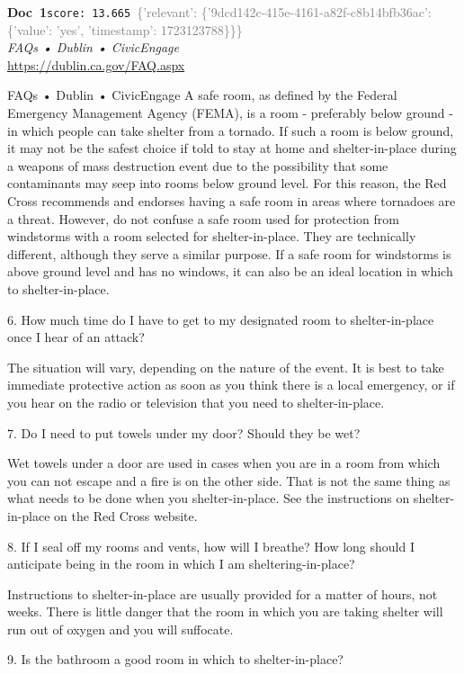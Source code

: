 \documentclass[a4paper,11pt]{article}
\begin{document}
\begin{docenv}
{\footnotesize\textcolor{doccolor}{\textbf{Doc~1}}}\hfill{\tiny\texttt{score:~13.665}}\ {\tiny\textcolor{gray}{\{'relevant': \{'9dcd142c-415e-4161-a82f-c8b14bfb36ac': \{'value': 'yes', 'timestamp': 1723123788\}\}\}}}\\[3pt]
{\small\textit{FAQs • Dublin • CivicEngage}}\\[2pt]
{\tiny\url{https://dublin.ca.gov/FAQ.aspx}}\\[4pt]
{\footnotesize FAQs • Dublin • CivicEngage
A safe room, as defined by the Federal Emergency Management Agency (FEMA), is a room - preferably below ground - in which people can take shelter from a tornado. If such a room is below ground, it may not be the safest choice if told to stay at home and shelter-in-place during a weapons of mass destruction event due to the possibility that some contaminants may seep into rooms below ground level. For this reason, the Red Cross recommends and endorses having a safe room in areas where tornadoes are a threat. However, do not confuse a safe room used for protection from windstorms with a room selected for shelter-in-place. They are technically different, although they serve a similar purpose. If a safe room for windstorms is above ground level and has no windows, it can also be an ideal location in which to shelter-in-place.	

6.
How much time do I have to get to my designated room to shelter-in-place once I hear of an attack?

The situation will vary, depending on the nature of the event. It is best to take immediate protective action as soon as you think there is a local emergency, or if you hear on the radio or television that you need to shelter-in-place.	

7.
Do I need to put towels under my door? Should they be wet?

Wet towels under a door are used in cases when you are in a room from which you can not escape and a fire is on the other side. That is not the same thing as what needs to be done when you shelter-in-place. See the instructions on shelter-in-place on the Red Cross website.	

8.
If I seal off my rooms and vents, how will I breathe? How long should I anticipate being in the room in which I am sheltering-in-place?

Instructions to shelter-in-place are usually provided for a matter of hours, not weeks. There is little danger that the room in which you are taking shelter will run out of oxygen and you will suffocate.	

9.
Is the bathroom a good room in which to shelter-in-place?}
\end{docenv}
\end{document}
